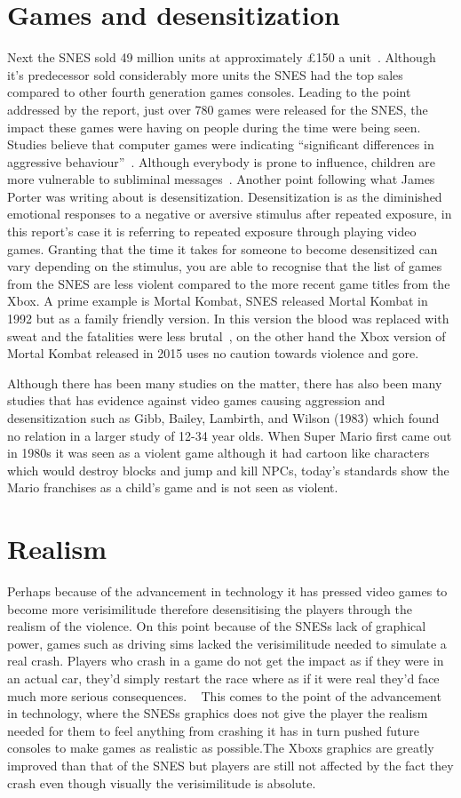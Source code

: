 \documentclass{scrartcl}
\begin{document}
\section{Games and desensitization}
Next the SNES sold 49 million units at approximately £150 a unit~\cite{2}. Although it's predecessor sold considerably more units the SNES had the top sales compared to other fourth generation games consoles. Leading to the point addressed by the report, just over 780 games were released for the SNES, the impact these games were having on people during the time were being seen. Studies believe that computer games were indicating “significant differences in aggressive behaviour”~\cite{3}. Although everybody is prone to influence, children are more vulnerable to subliminal messages~\cite{6}. Another point following what James Porter was writing about is desensitization. Desensitization is as the diminished emotional responses to a negative or aversive stimulus after repeated exposure, in this report's case it is referring to repeated exposure through playing video games. Granting that the time it takes for someone to become desensitized can vary depending on the stimulus, you are able to recognise that the list of games from the SNES are less violent compared to the more recent game titles from the Xbox. A prime example is Mortal Kombat, SNES released Mortal Kombat in 1992 but as a family friendly version. In this version the blood was replaced with sweat and the fatalities were less brutal~\cite{8}, on the other hand the Xbox version of Mortal Kombat released in 2015 uses no caution towards violence and gore.

Although there has been many studies on the matter, there has also been many studies that has evidence against video games causing aggression and desensitization such as Gibb, Bailey, Lambirth, and Wilson (1983) which found no relation in a larger study of 12-34 year olds. When Super Mario first came out in 1980s it was seen as a violent game although it had cartoon like characters which would destroy blocks and jump and kill NPCs, today's standards show the Mario franchises as a child's game and is not seen as violent.~\cite{9}
\section{Realism}
 Perhaps because of the advancement in technology it has pressed video games to become more verisimilitude therefore desensitising the players through the realism of the violence. On this point because of the SNESs lack of graphical power, games such as driving sims lacked the verisimilitude needed to simulate a real crash. Players who crash in a game do not get the impact as if they were in an actual car, they'd simply restart the race where as if it were real they'd face much more serious consequences. ~\cite{9} This comes to the point of the advancement in technology, where the SNESs graphics does not give the player the realism needed for them to feel anything from crashing it has in turn pushed future consoles to make games as realistic as possible.The Xboxs graphics are greatly improved than that of the SNES but players are still not affected by the fact they crash even though visually the verisimilitude is absolute.~\cite{9}
\end{document}
